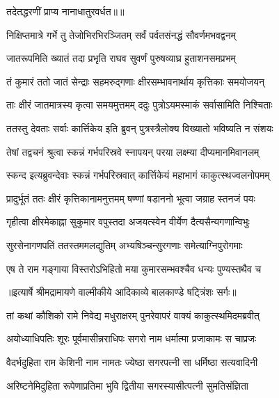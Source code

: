{तदेतद्धरणीं प्राप्य नानाधातुरवर्धत॥॥} %

\addtocounter{shlokacount}{1}

\twolineshloka
{निक्षिप्तमात्रे गर्भे तु तेजोभिरभिरञ्जितम्}
{सर्वं पर्वतसंनद्धं सौवर्णमभवद्वनम्} %

\twolineshloka
{जातरूपमिति ख्यातं तदा प्रभृति राघव}
{सुवर्णं पुरुषव्याघ्र हुताशनसमप्रभम्} %

\twolineshloka
{तं कुमारं ततो जातं सेन्द्राः सहमरुद्गणाः}
{क्षीरसम्भावनार्थाय कृत्तिकाः समयोजयन्} %

\twolineshloka
{ताः क्षीरं जातमात्रस्य कृत्वा समयमुत्तमम्}
{ददुः पुत्रोऽयमस्माकं सर्वासामिति निश्चिताः} %

\twolineshloka
{ततस्तु देवताः सर्वाः कार्त्तिकेय इति ब्रुवन्}
{पुत्रस्त्रैलोक्य विख्यातो भविष्यति न संशयः} %

\twolineshloka
{तेषां तद्वचनं श्रुत्वा स्कन्नं गर्भपरिस्रवे}
{स्नापयन् परया लक्ष्म्या दीप्यमानमिवानलम्} %

\twolineshloka
{स्कन्द इत्यब्रुवन्देवाः स्कन्नं गर्भपरिस्रवात्}
{कार्त्तिकेयं महाभागं काकुत्स्थज्वलनोपमम्} %

\twolineshloka
{प्रादुर्भूतं ततः क्षीरं कृत्तिकानामनुत्तमम्}
{षण्णां षडाननो भूत्वा जग्राह स्तनजं पयः} %

\twolineshloka
{गृहीत्वा क्षीरमेकाह्ना सुकुमार वपुस्तदा}
{अजयत्स्वेन वीर्येण दैत्यसैन्यगणान्विभुः} %

\twolineshloka
{सुरसेनागणपतिं ततस्तममलद्युतिम्}
{अभ्यषिञ्चन्सुरगणाः समेत्याग्निपुरोगमाः} %

\twolineshloka
{एष ते राम गङ्गाया विस्तरोऽभिहितो मया}
{कुमारसम्भवश्चैव धन्यः पुण्यस्तथैव च} %


{॥इत्यार्षे श्रीमद्रामायणे वाल्मीकीये आदिकाव्ये बालकाण्डे षट्त्रिंशः सर्गः॥}


\twolineshloka
{तां कथां कौशिको रामे निवेद्य मधुराक्षरम्}
{पुनरेवापरं वाक्यं काकुत्स्थमिदमब्रवीत्} %

\twolineshloka
{अयोध्याधिपतिः शूरः पूर्वमासीन्नराधिपः}
{सगरो नाम धर्मात्मा प्रजाकामः स चाप्रजः} %

\twolineshloka
{वैदर्भदुहिता राम केशिनी नाम नामतः}
{ज्येष्ठा सगरपत्नी सा धर्मिष्ठा सत्यवादिनी} %

\twolineshloka
{अरिष्टनेमिदुहिता रूपेणाप्रतिमा भुवि}
{द्वितीया सगरस्यासीत्पत्नी सुमतिसंज्ञिता} %


